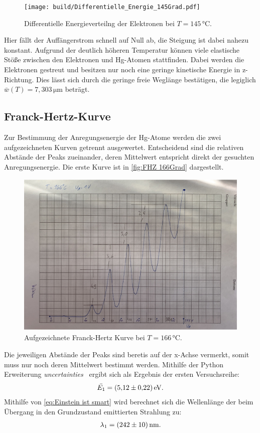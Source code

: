 \begin{figure}[H]
    \centering
    \texttt{[image: build/Differentielle\_Energie\_145Grad.pdf]}
    \caption{Differentielle Energieverteilng der Elektronen bei $T=145\,\unit{\celsius}$.}
    \label{fig:Diff Energie 145Grad}
\end{figure}

Hier fällt der Auffängerstrom schnell auf Null ab, die Steigung ist dabei nahezu konstant.
Aufgrund der deutlich höheren Temperatur können viele elastische Stöße
zwischen den Elektronen und Hg-Atomen stattfinden. Dabei werden die Elektronen gestreut und besitzen nur noch
eine geringe kinetische Energie in z-Richtung.
Dies lässt sich durch die geringe freie Weglänge bestätigen, die legiglich $\bar{w}(T) = 7,303\,\unit{\micro\meter}$ beträgt.

\subsection{Franck-Hertz-Kurve}

Zur Bestimmung der Anregungsenergie der Hg-Atome werden die zwei aufgezeichneten Kurven getrennt ausgewertet.
Entscheidend sind die relativen Abstände der Peaks zueinander, deren Mittelwert entspricht direkt der
gesuchten Anregungsenergie. Die erste Kurve ist in \autoref{fig:FHZ 166Grad} dargestellt.

\begin{figure}[H]
  \centering
  \includegraphics[height=8cm]{content/data/FH_166.pdf}
  \caption{Aufgezeichnete Franck-Hertz Kurve bei $T=166\,\unit{\celsius}$.}
  \label{fig:FHZ 166Grad}
\end{figure}

Die jeweiligen Abstände der Peaks sind beretis auf der x-Achse vermerkt, somit muss nur noch deren
Mittelwert bestimmt werden. Mithilfe der Python Erweiterung \textit{uncertainties}~\cite{uncertainties} 
ergibt sich als Ergebnis der ersten Versuchsreihe:
\begin{gather*}
    \bar{E_1}=\qty{5.12+-0.22}{\electronvolt}.
\end{gather*}
Mithilfe von \eqref{eq:Einstein ist smart} wird berechnet sich die Wellenlänge der beim Übergang in den
Grundzustand emittierten Strahlung zu:
\begin{gather*}
  \lambda_1=\qty{242+-10}{\nano\meter}.
\end{gather*}

